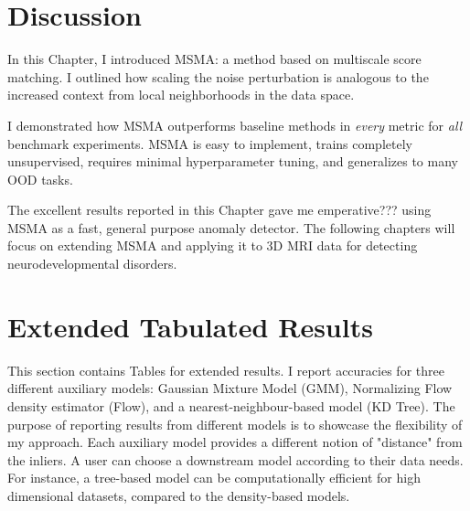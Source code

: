 
\section{Discussion}

In this Chapter, I introduced MSMA: a method based on multiscale score matching. I outlined how scaling the noise perturbation is analogous to the increased context from local neighborhoods in the data space.  


I demonstrated how MSMA outperforms baseline methods in \textit{every} metric for \textit{all} benchmark experiments. MSMA is easy to implement, trains completely unsupervised, requires minimal hyperparameter tuning, and generalizes to many OOD tasks.

The excellent results reported in this Chapter gave me emperative??? using MSMA as a fast, general purpose anomaly detector. The following chapters will focus on extending MSMA and applying it to 3D MRI data for detecting neurodevelopmental disorders.

\section{Extended Tabulated Results}
\label{msma_extended_results}

This section contains Tables for extended results. I report accuracies for three different auxiliary models: Gaussian Mixture Model (GMM), Normalizing Flow density estimator (Flow), and a nearest-neighbour-based model (KD Tree). The purpose of reporting results from different models is to showcase the flexibility of my approach. Each auxiliary model provides a different notion of "distance" from the inliers. A user can choose a downstream model according to their data needs. For instance, a tree-based model can be computationally efficient for high dimensional datasets, compared to the density-based models.

